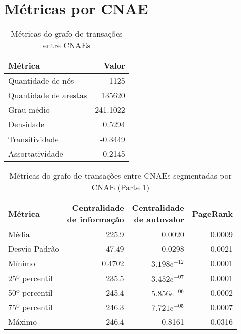 \section{Métricas por CNAE}

\begin{table}[htb]
\centering
\caption{Métricas do grafo de transações entre CNAEs}
\label{tab:metricas-redes:grafo-por-cnae}
    \begin{tabular}{l|r}
    \toprule
    Métrica &  Valor \\
    \midrule
    Quantidade de nós     &   1125      \\
    Quantidade de arestas & 135620      \\
    Grau médio            &    241.1022 \\
    Densidade             &      0.5294 \\
    Transitividade        &     -0.3449 \\
    Assortatividade       &      0.2145 \\
    \bottomrule
    \end{tabular}
\fdadospesquisa
\end{table}

\begin{table}[htb]
\centering
\caption{Métricas do grafo de transações entre CNAEs segmentadas por CNAE (Parte 1)}
\label{tab:metricas-redes:grafo-por-cnae-especificas1}
\begin{tabular}{l|rrr}
\toprule
Métrica & \shortstack{Centralidade\\de informação} &  \shortstack{Centralidade\\de autovalor} &  PageRank \\
\midrule
Média         &  225.9 &         0.0020 &  0.0009 \\
Desvio Padrão &  47.49 &         0.0298 &  0.0021 \\
Mínimo        & 0.4702 & $3.198e^{-12}$ &  0.0001 \\
25º percentil &  235.5 & $3.452e^{-07}$ &  0.0001 \\
50º percentil &  245.4 & $5.856e^{-06}$ &  0.0002 \\
75º percentil &  246.3 & $7.721e^{-05}$ &  0.0007 \\
Máximo        &  246.4 &         0.8161 &  0.0316 \\
\bottomrule
\end{tabular}
\fdadospesquisa
\end{table}


